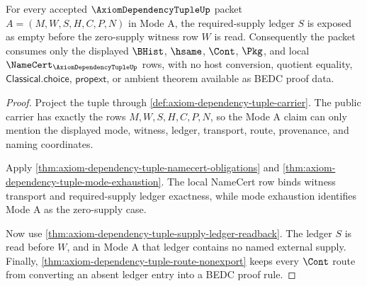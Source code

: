 \begin{theorem}
\label{thm:axiom-dependency-tuple-zero-supply-mode-exactness}
For every accepted $\AxiomDependencyTupleUp$ packet
$A=(M,W,S,H,C,P,N)$ in Mode A, the required-supply ledger $S$ is exposed as
empty before the zero-supply witness row $W$ is read. Consequently the packet
consumes only the displayed $\BHist$, $\hsame$, $\Cont$, $\Pkg$, and local
$\NameCert_{\AxiomDependencyTupleUp}$ rows, with no host conversion, quotient
equality, $\mathsf{Classical.choice}$, $\mathsf{propext}$, or ambient theorem
available as BEDC proof data.
\end{theorem}
\begin{proof}
Project the tuple through
\autoref{def:axiom-dependency-tuple-carrier}. The public carrier has exactly
the rows $M,W,S,H,C,P,N$, so the Mode A claim can only mention the displayed
mode, witness, ledger, transport, route, provenance, and naming coordinates.

Apply \autoref{thm:axiom-dependency-tuple-namecert-obligations} and
\autoref{thm:axiom-dependency-tuple-mode-exhaustion}. The local NameCert row
binds witness transport and required-supply ledger exactness, while mode
exhaustion identifies Mode A as the zero-supply case.

Now use \autoref{thm:axiom-dependency-tuple-supply-ledger-readback}. The ledger
$S$ is read before $W$, and in Mode A that ledger contains no named external
supply. Finally,
\autoref{thm:axiom-dependency-tuple-route-nonexport} keeps every $\Cont$ route
from converting an absent ledger entry into a BEDC proof rule.
\end{proof}

